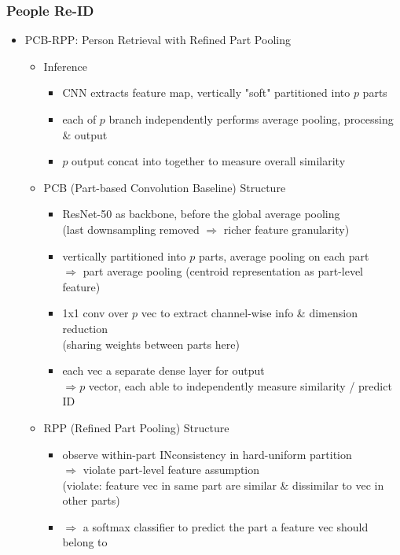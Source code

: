 \subsubsection{People Re-ID}
\begin{itemize}
\item PCB-RPP: Person Retrieval with Refined Part Pooling
	\begin{itemize}
	\item Inference 
		\begin{itemize}
		\item CNN extracts feature map, vertically "soft" partitioned into $p$ parts
		\item each of $p$ branch independently performs average pooling, processing \& output 
		\item $p$ output concat into together to measure overall similarity
		\end{itemize}
	\item PCB (Part-based Convolution Baseline) Structure
		\begin{itemize}
		\item ResNet-50 as backbone, before the global average pooling \\
		(last downsampling removed $\Rightarrow$ richer feature granularity)
		\item vertically partitioned into $p$ parts, average pooling on each part \\
		$\Rightarrow$ part average pooling (centroid representation as part-level feature)
		\item 1x1 conv over $p$ vec to extract channel-wise info \& dimension reduction \\
		(sharing weights between parts here)
		\item each vec a separate dense layer for output \\
		$\Rightarrow p$ vector, each able to independently measure similarity / predict ID
		\end{itemize}
	\item RPP (Refined Part Pooling) Structure
		\begin{itemize}
		\item observe within-part INconsistency in hard-uniform partition \\
		$\Rightarrow$ violate part-level feature assumption \\
		(violate: feature vec in same part are similar \& dissimilar to vec in other parts)
		\item $\Rightarrow$ a softmax classifier to predict the part a feature vec should belong to \\

\end{itemize}
\end{itemize}
\end{itemize}
